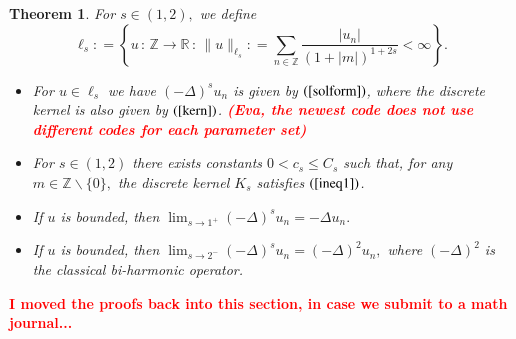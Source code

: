 \documentclass[final,1p,times]{elsarticle}
\def\ZZ{\mathbb Z} %
\def\RR{\mathbb R} %
\def\l{\left}
\def\r{\right}
\newcommand{\no}{\noindent}
\def\R#1{$(\ref{#1})$}
\newtheorem{theorem}{Theorem}
\theoremstyle{remark}
\theoremstyle{definition}
\newcommand{\josh}[1]{\textcolor{red}{\textbf{#1}}}
\begin{document}
\begin{theorem}
For $s\in (1,2),$ we define
$$\ell_{s}\mathrel{\mathop:}= \l\{u\,:\,\ZZ\to\RR\,:\,\|u\|_{\ell_{s}}\mathrel{\mathop:}= \sum_{n\in\ZZ}\frac{|u_n|}{(1+|m|)^{1+ 2s}}<\infty\r\}.$$
\begin{itemize}
\item[i.] For $u\in \ell_{s}$ we have $(-\Delta)^su_n$ is given by \R{solform}, where the discrete kernel is also given by \R{kern}. \josh{(Eva, the newest code does not use different codes for each parameter set)}

\item[ii.] For $s\in (1,2)$ there exists constants $0 < c_s \le C_s$ such that, for any $m\in\ZZ\backslash\{0\},$ the discrete kernel $K_s$ satisfies \R{ineq1}.

\item[iii.] If $u$ is bounded, then $\lim_{s\to 1^+}(-\Delta)^s u_n = -\Delta u_n.$

\item[iv.] If $u$ is bounded, then $\lim_{s\to 2^-} (-\Delta)^s u_n = (-\Delta)^2 u_n,$ where $(-\Delta)^2$ is the classical {\em bi-harmonic operator}.
\end{itemize}
\end{theorem}

\no\josh{I moved the proofs back into this section, in case we submit to a math journal...}
\end{document}
